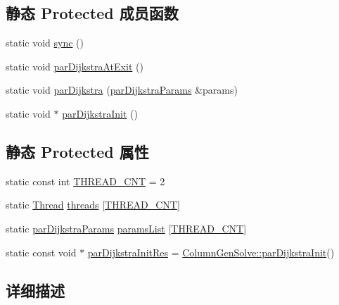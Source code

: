\subsection*{静态 Protected 成员函数}
\begin{DoxyCompactItemize}
\item 
static void \hyperlink{classColumnGenSolve_ab976cab8582808218110d86252177f88}{sync} ()
\item 
static void \hyperlink{classColumnGenSolve_a5501879ba2b6480f0bacbc38b6e5121e}{par\+Dijkstra\+At\+Exit} ()
\item 
static void \hyperlink{classColumnGenSolve_a6dc294df38e9aa3160f435bd527f2f20}{par\+Dijkstra} (\hyperlink{structColumnGenSolve_1_1parDijkstraParams}{par\+Dijkstra\+Params} \&params)
\item 
static void $\ast$ \hyperlink{classColumnGenSolve_a97e581fdab12a396fd173b030ec26bec}{par\+Dijkstra\+Init} ()
\end{DoxyCompactItemize}
\subsection*{静态 Protected 属性}
\begin{DoxyCompactItemize}
\item 
static const int \hyperlink{classColumnGenSolve_a6ead284bdba22a11e3b84eb873807e23}{T\+H\+R\+E\+A\+D\+\_\+\+C\+NT} = 2
\item 
static \hyperlink{global_8h_ab4108db709b91dc2efcd48309edb9f5e}{Thread} \hyperlink{classColumnGenSolve_ae836bca68776f265a26e46c7e842492e}{threads} \mbox{[}\hyperlink{classColumnGenSolve_a6ead284bdba22a11e3b84eb873807e23}{T\+H\+R\+E\+A\+D\+\_\+\+C\+NT}\mbox{]}
\item 
static \hyperlink{structColumnGenSolve_1_1parDijkstraParams}{par\+Dijkstra\+Params} \hyperlink{classColumnGenSolve_aba2e5f0dc752db74718e834faf9ef606}{params\+List} \mbox{[}\hyperlink{classColumnGenSolve_a6ead284bdba22a11e3b84eb873807e23}{T\+H\+R\+E\+A\+D\+\_\+\+C\+NT}\mbox{]}
\item 
static const void $\ast$ \hyperlink{classColumnGenSolve_ac77eb4def69a3476015487be8a49818a}{par\+Dijkstra\+Init\+Res} = \hyperlink{classColumnGenSolve_a97e581fdab12a396fd173b030ec26bec}{Column\+Gen\+Solve\+::par\+Dijkstra\+Init}()
\end{DoxyCompactItemize}


\subsection{详细描述}


